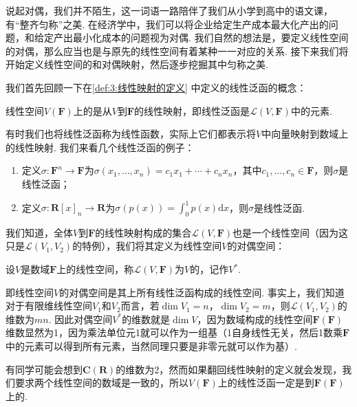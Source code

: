 说起对偶，我们并不陌生，这一词语一路陪伴了我们从小学到高中的语文课，有``整齐匀称''之美. 在经济学中，我们可以将企业给定生产成本最大化产出的问题，和给定产出最小化成本的问题视为对偶. 我们自然的想法是，要定义线性空间的对偶，那么应当也是与原先的线性空间有着某种一一对应的关系. 接下来我们将开始定义线性空间的和对偶映射，然后逐步挖掘其中匀称之美.

我们首先回顾一下在\autoref{def:3:线性映射的定义} 中定义的线性泛函的概念：
\begin{definition}[线性泛函] 
    线性空间$V(\mathbf{F})$上的是从$V$到$\mathbf{F}$的线性映射，即线性泛函是$\mathcal{L}(V,\mathbf{F})$中的元素.
\end{definition}
有时我们也将线性泛函称为线性函数，实际上它们都表示将$V$中向量映射到数域上的线性映射. 我们来看几个线性泛函的例子：
\begin{enumerate}
    \item 定义$\sigma:\mathbf{F}^n\to\mathbf{F}$为$\sigma(x_1,\ldots,x_n)=c_1x_1+\cdots+c_nx_n$，其中$c_1,\ldots,c_n\in\mathbf{F}$，则$\sigma$是线性泛函；

    \item 定义$\sigma:\mathbf{R}[x]_n\to\mathbf{R}$为$\sigma(p(x))=\displaystyle\int_0^1p(x)\mathrm{d}x$，则$\sigma$是线性泛函.
\end{enumerate}

我们知道，全体$V$到$\mathbf{F}$的线性映射构成的集合$\mathcal{L}(V,\mathbf{F})$也是一个线性空间（因为这只是$\mathcal{L}(V_1,V_2)$的特例），我们将其定义为线性空间$V$的对偶空间：
\begin{definition}[对偶空间] 
    设$V$是数域$\mathbf{F}$上的线性空间，称$\mathcal{L}(V,\mathbf{F})$为$V$的，记作$V^*$.
\end{definition}

即线性空间$V$的对偶空间是其上所有线性泛函构成的线性空间. 事实上，我们知道对于有限维线性空间$V_1$和$V_2$而言，若$\dim V_1=n$，$\dim V_2=m$，则$\mathcal{L}(V_1,V_2)$的维数为$mn$. 因此对偶空间$V^*$的维数就是$\dim V$，因为数域构成的线性空间$\mathbf{F}(\mathbf{F})$维数显然为1，因为乘法单位元1就可以作为一组基（1自身线性无关，然后1数乘$\mathbf{F}$中的元素可以得到所有元素，当然同理只要是非零元就可以作为基）.

有同学可能会想到$\mathbf{C}(\mathbf{R})$的维数为2，然而如果翻回线性映射的定义就会发现，我们要求两个线性空间的数域是一致的，所以$V(\mathbf{F})$上的线性泛函一定是到$\mathbf{F}(\mathbf{F})$上的.

